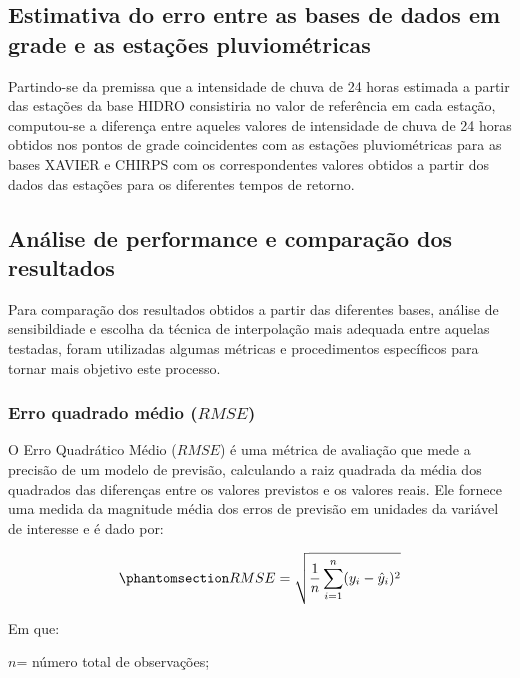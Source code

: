 \documentclass[
]{agujournal2019}
\begin{document}
\subsection{Estimativa do erro entre as bases de dados em grade e as
estações
pluviométricas}\label{estimativa-do-erro-entre-as-bases-de-dados-em-grade-e-as-estauxe7uxf5es-pluviomuxe9tricas}

Partindo-se da premissa que a intensidade de chuva de 24 horas estimada
a partir das estações da base HIDRO consistiria no valor de referência
em cada estação, computou-se a diferença entre aqueles valores de
intensidade de chuva de 24 horas obtidos nos pontos de grade
coincidentes com as estações pluviométricas para as bases XAVIER e
CHIRPS com os correspondentes valores obtidos a partir dos dados das
estações para os diferentes tempos de retorno.

\subsection{Análise de performance e comparação dos
resultados}\label{anuxe1lise-de-performance-e-comparauxe7uxe3o-dos-resultados}

Para comparação dos resultados obtidos a partir das diferentes bases,
análise de sensibildiade e escolha da técnica de interpolação mais
adequada entre aquelas testadas, foram utilizadas algumas métricas e
procedimentos específicos para tornar mais objetivo este processo.

\subsubsection{\texorpdfstring{Erro quadrado médio
(\(RMSE\))}{Erro quadrado médio (RMSE)}}\label{erro-quadrado-muxe9dio-rmse}

O Erro Quadrático Médio (\(RMSE\)) é uma métrica de avaliação que mede a
precisão de um modelo de previsão, calculando a raiz quadrada da média
dos quadrados das diferenças entre os valores previstos e os valores
reais. Ele fornece uma medida da magnitude média dos erros de previsão
em unidades da variável de interesse e é dado por:

\begin{equation}\phantomsection\label{eq-Eq9}{
RMSE = \sqrt{\frac{1}{n} \sum_{i=1}^{n} (y_i - \hat{y}_i)^2}
}\end{equation}

Em que:

\(n\)= número total de observações;
\end{document}
